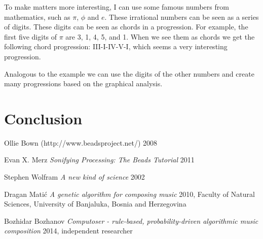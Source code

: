 \documentclass[12pt]{article}
\begin{document}
To make matters more interesting, I can use some famous numbers from mathematics, such as $\pi$, $\phi$ and $e$. These irrational numbers can be seen as a series of digits. These digits can be seen as chords in a progression. For example, the first five digits of $\pi$ are 3, 1, 4, 5, and 1. When we see them as chords we get the following chord progression: III-I-IV-V-I, which seems a very interesting progression.
\newline

Analogous to the example we can use the digits of the other numbers and create many progressions based on the graphical analysis.

\section{Conclusion}

\begin{thebibliography}{1}

 Ollie Bown (http://www.beadsproject.net/) 2008

 Evan X. Merz {\em Sonifying Processing: The Beads Tutorial} 2011

 Stephen Wolfram {\em A new kind of science} 2002

 Dragan Mati\'c {\em A genetic algorithm for composing music} 2010, Faculty of Natural Sciences, University of Banjaluka, Bosnia and Herzegovina

 Bozhidar Bozhanov {\em Computoser - rule-based, probability-driven algorithmic music composition} 2014,  independent researcher

\end{thebibliography}
\end{document}
